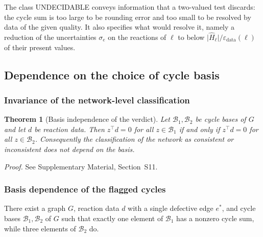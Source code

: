 \documentclass[11pt,a4paper]{article}
\theoremstyle{pstyle}
\newtheorem{theorem}{Theorem}[section]
\theoremstyle{definition}
\theoremstyle{remark}
\newcommand{\abs}[1]{\lvert#1\rvert}
\newcommand{\eps}{\varepsilon}
\newcommand{\epsdata}{\eps_{\mathrm{data}}}
\newcommand{\hol}{H}
\begin{document}
\begin{remark}
\label{rem:undecidable}
The class \textsf{UNDECIDABLE} conveys information that a two-valued
test discards: the cycle sum is too large to be rounding error and too
small to be resolved by data of the given quality. It also specifies
what would resolve it, namely a reduction of the uncertainties
$\sigma_e$ on the reactions of $\ell$ to below
$\abs{\widehat{\hol}_\ell}/\epsdata(\ell)$ of their present values.
\end{remark}

\subsection{Dependence on the choice of cycle basis}
\label{sec:basis}

\subsubsection{Invariance of the network-level classification}

\begin{theorem}[Basis independence of the verdict]
\label{thm:basis-verdict}
Let $\mathcal{B}_1,\mathcal{B}_2$ be cycle bases of $G$ and let $d$ be
reaction data. Then $z^{\top}d = 0$ for all $z\in\mathcal{B}_1$ if and
only if $z^{\top}d=0$ for all $z\in\mathcal{B}_2$. Consequently the
classification of the network as consistent or inconsistent does not
depend on the basis.
\end{theorem}

\noindent\emph{Proof.} See Supplementary Material, Section~S11.

\subsubsection{Basis dependence of the flagged cycles}

\begin{proposition}
\label{prop:basis-localisation}
There exist a graph $G$, reaction data $d$ with a single defective edge
$e^{\ast}$, and cycle bases $\mathcal{B}_1,\mathcal{B}_2$ of $G$ such
that exactly one element of $\mathcal{B}_1$ has a nonzero cycle sum,
while three elements of $\mathcal{B}_2$ do.
\end{proposition}
\end{document}
